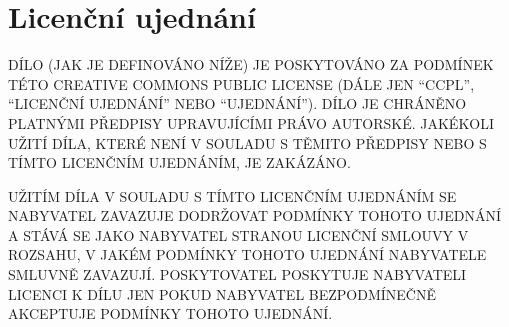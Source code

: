 

\chapter{Licenční ujednání}
\label{ch:license}

DÍLO (JAK JE DEFINOVÁNO NÍŽE) JE POSKYTOVÁNO ZA PODMÍNEK TÉTO CREATIVE COMMONS PUBLIC LICENSE (DÁLE JEN ``CCPL'', ``LICENČNÍ UJEDNÁNÍ'' NEBO ``UJEDNÁNÍ''). DÍLO JE CHRÁNĚNO PLATNÝMI PŘEDPISY UPRAVUJÍCÍMI PRÁVO AUTORSKÉ. JAKÉKOLI UŽITÍ DÍLA, KTERÉ NENÍ V SOULADU S TĚMITO PŘEDPISY NEBO S TÍMTO LICENČNÍM UJEDNÁNÍM, JE ZAKÁZÁNO.

UŽITÍM DÍLA V SOULADU S TÍMTO LICENČNÍM UJEDNÁNÍM SE NABYVATEL ZAVAZUJE DODRŽOVAT PODMÍNKY TOHOTO UJEDNÁNÍ A STÁVÁ SE JAKO NABYVATEL STRANOU LICENČNÍ SMLOUVY V ROZSAHU, V JAKÉM PODMÍNKY TOHOTO UJEDNÁNÍ NABYVATELE SMLUVNĚ ZAVAZUJÍ. POSKYTOVATEL POSKYTUJE NABYVATELI LICENCI K DÍLU JEN POKUD NABYVATEL BEZPODMÍNEČNĚ AKCEPTUJE PODMÍNKY TOHOTO UJEDNÁNÍ.

